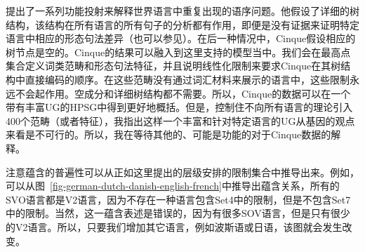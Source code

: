  提出了一系列功能投射来解释世界语言中重复出现的语序问题。他假设了详细的树结构，该结构在所有语言的所有句子的分析都有作用，即便是没有证据来证明特定语言中相应的形态句法差异（也可以参见\citealp[]{CR2010a}）。在后一种情况中，Cinque假设相应的树节点是空的。Cinque的结果可以融入到这里支持的模型当中。我们会在最高点集合定义词类范畴和形态句法特征，并且说明线性化限制来要求Cinque在其树结构中直接编码的顺序。在这些范畴没有通过词汇材料来展示的语言中，这些限制永远不会起作用。空成分和详细树结构都不需要。所以，Cinque的数据可以在一个带有丰富UG的HPSG中得到更好地概括。但是，控制住不向所有语言的理论引入400个范畴（或者特征），我指出这样一个丰富和针对特定语言的UG从基因的观点来看是不可行的。所以，我在等待其他的、可能是功能的对于Cinque数据的解释。

注意蕴含的普遍性可以从正如这里提出的层级安排的限制集合中推导出来。例如，可以从图~\ref{fig-german-dutch-danish-english-french}中推导出蕴含关系，所有的SVO语言都是V2语言，因为不存在一种语言包含Set4中的限制，但是不包含Set7中的限制。当然，这一蕴含表述是错误的，因为有很多SOV语言，但是只有很少的V2语言。所以，只要我们增加其它语言，例如波斯语或日语，该图就会发生改变。

